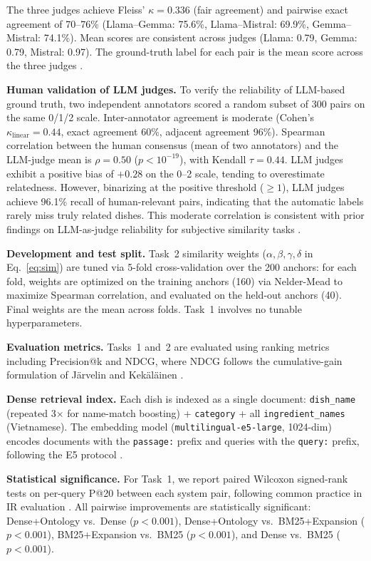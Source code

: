The three judges achieve Fleiss' $\kappa = 0.336$ (fair agreement) and pairwise exact agreement of 70--76\% (Llama--Gemma: 75.6\%, Llama--Mistral: 69.9\%, Gemma--Mistral: 74.1\%). Mean scores are consistent across judges (Llama: 0.79, Gemma: 0.79, Mistral: 0.97). The ground-truth label for each pair is the mean score across the three judges \cite{zheng2023judge, chen2024judgebias, huang2025llmjudge}.

\textbf{Human validation of LLM judges.}
To verify the reliability of LLM-based ground truth, two independent annotators scored a random subset of 300 pairs on the same 0/1/2 scale. Inter-annotator agreement is moderate (Cohen's $\kappa_{\text{linear}} = 0.44$, exact agreement 60\%, adjacent agreement 96\%). Spearman correlation between the human consensus (mean of two annotators) and the LLM-judge mean is $\rho = 0.50$ ($p < 10^{-19}$), with Kendall $\tau = 0.44$. LLM judges exhibit a positive bias of $+0.28$ on the 0--2 scale, tending to overestimate relatedness. However, binarizing at the positive threshold ($\geq 1$), LLM judges achieve 96.1\% recall of human-relevant pairs, indicating that the automatic labels rarely miss truly related dishes. This moderate correlation is consistent with prior findings on LLM-as-judge reliability for subjective similarity tasks \cite{zheng2023judge}.

\textbf{Development and test split.}
Task~2 similarity weights ($\alpha, \beta, \gamma, \delta$ in Eq.~\ref{eq:sim}) are tuned via 5-fold cross-validation over the 200 anchors: for each fold, weights are optimized on the training anchors (160) via Nelder-Mead to maximize Spearman correlation, and evaluated on the held-out anchors (40). Final weights are the mean across folds. Task~1 involves no tunable hyperparameters.

\textbf{Evaluation metrics.}
Tasks~1 and~2 are evaluated using ranking metrics including Precision@k and NDCG, where NDCG follows the cumulative-gain formulation of J\"arvelin and Kek\"al\"ainen \cite{jarvelin2002cg}.

\textbf{Dense retrieval index.}
Each dish is indexed as a single document: \texttt{dish\_name} (repeated 3$\times$ for name-match boosting) + \texttt{category} + all \texttt{ingredient\_names} (Vietnamese). The embedding model (\texttt{multilingual-e5-large}, 1024-dim) encodes documents with the \texttt{passage:} prefix and queries with the \texttt{query:} prefix, following the E5 protocol \cite{wang2024multilinguale5}.

\textbf{Statistical significance.}
For Task~1, we report paired Wilcoxon signed-rank tests on per-query P@20 between each system pair, following common practice in IR evaluation \cite{smucker2007sigtest}. All pairwise improvements are statistically significant: Dense+Ontology vs.\ Dense ($p < 0.001$), Dense+Ontology vs.\ BM25+Expansion ($p < 0.001$), BM25+Expansion vs.\ BM25 ($p < 0.001$), and Dense vs.\ BM25 ($p < 0.001$).

